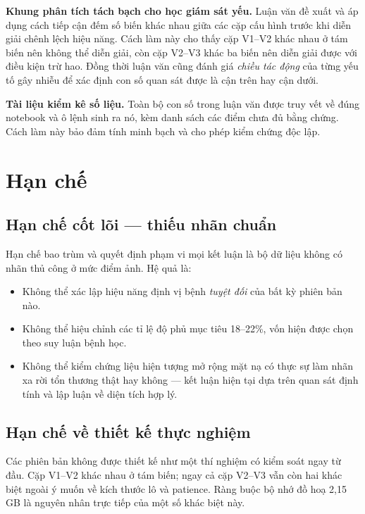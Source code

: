 \textbf{Khung phân tích tách bạch cho học giám sát yếu.} Luận văn đề xuất và áp
dụng cách tiếp cận đếm số biến khác nhau giữa các cặp cấu hình trước khi diễn giải
chênh lệch hiệu năng. Cách làm này cho thấy cặp V1--V2 khác nhau ở tám biến nên
không thể diễn giải, còn cặp V2--V3 khác ba biến nên diễn giải được với điều kiện
trừ hao. Đồng thời luận văn cũng đánh giá \emph{chiều tác động} của từng yếu tố
gây nhiễu để xác định con số quan sát được là cận trên hay cận dưới.

\textbf{Tài liệu kiểm kê số liệu.} Toàn bộ con số trong luận văn được truy vết về
đúng notebook và ô lệnh sinh ra nó, kèm danh sách các điểm chưa đủ bằng chứng.
Cách làm này bảo đảm tính minh bạch và cho phép kiểm chứng độc lập.

\section{Hạn chế}

\subsection{Hạn chế cốt lõi --- thiếu nhãn chuẩn}

Hạn chế bao trùm và quyết định phạm vi mọi kết luận là bộ dữ liệu không có nhãn
thủ công ở mức điểm ảnh. Hệ quả là:

\begin{itemize}
    \item Không thể xác lập hiệu năng định vị bệnh \emph{tuyệt đối} của bất kỳ
          phiên bản nào.
    \item Không thể hiệu chỉnh các tỉ lệ độ phủ mục tiêu 18--22\%, vốn hiện được
          chọn theo suy luận bệnh học.
    \item Không thể kiểm chứng liệu hiện tượng \SAM{} mở rộng mặt nạ có thực sự
          làm nhãn xa rời tổn thương thật hay không --- kết luận hiện tại dựa trên
          quan sát định tính và lập luận về diện tích hợp lý.
\end{itemize}

\subsection{Hạn chế về thiết kế thực nghiệm}

Các phiên bản không được thiết kế như một thí nghiệm có kiểm soát ngay từ đầu.
Cặp V1--V2 khác nhau ở tám biến; ngay cả cặp V2--V3 vẫn còn hai khác biệt ngoài ý
muốn về kích thước lô và patience. Ràng buộc bộ nhớ đồ hoạ 2,15 GB là nguyên nhân
trực tiếp của một số khác biệt này.

